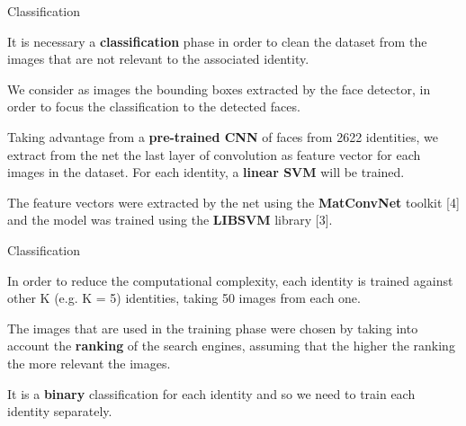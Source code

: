 \begin{tframe}{Classification}

It is necessary a \textbf{classification} phase in order to clean the dataset from the images that are not relevant to the associated identity.

\vspace{0.1in}

We consider as images the bounding boxes extracted by the face detector, in order to focus the classification to the detected faces.

\vspace{0.1in}

Taking advantage from a \textbf{pre-trained CNN} of faces from 2622 identities, we extract from the net the last layer of convolution as feature vector for each images in the dataset. For each identity, a \textbf{linear SVM} will be trained.

\vspace{0.1in}

The feature vectors were extracted by the net using the \textbf{MatConvNet} toolkit [4] and the model was trained using the \textbf{LIBSVM} library [3].

\end{tframe}


\begin{tframe}{Classification}

In order to reduce the computational complexity, each identity is trained against other K (e.g. K = 5) identities, taking 50 images from each one.

\vspace{0.1in}

The images that are used in the training phase were chosen by taking into account the \textbf{ranking} of the search engines, assuming that the higher the ranking the more relevant the images.

\vspace{0.1in}

It is a \textbf{binary} classification for each identity and so we need to train each identity separately.

\end{tframe}